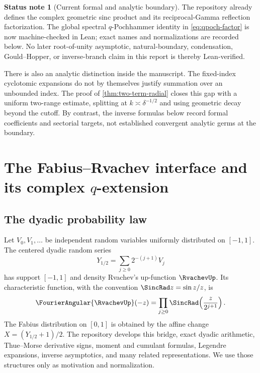 \documentclass[11pt]{article}
\theoremstyle{definition}
\newtheorem{status}[theorem]{Status note}
\begin{document}
\begin{status}[Current formal and analytic boundary]
The repository already defines the complex geometric sinc product and its
reciprocal-Gamma reflection factorization.  The global spectral
$q$-Pochhammer identity in \cref{eq:qpoch-factor} is now machine-checked in
Lean; exact names and normalizations are recorded below.  No later
root-of-unity asymptotic, natural-boundary, condensation, Gould--Hopper, or
inverse-branch claim in this report is thereby Lean-verified.

There is also an analytic distinction inside the manuscript.  The fixed-index
cyclotomic expansions do not by themselves justify summation over an unbounded
index.  The proof of \cref{thm:two-term-radial} closes this gap with a uniform
two-range estimate, splitting at $k\asymp\delta^{-1/2}$ and using geometric
decay beyond the cutoff.  By contrast, the inverse formulas below record
formal coefficients and sectorial targets, not established convergent analytic
germs at the boundary.
\end{status}

\section{The Fabius--Rvachev interface and its complex
\texorpdfstring{$q$}{q}-extension}

\subsection{The dyadic probability law}

Let $V_0,V_1,\dots$ be independent random variables uniformly distributed on $[-1,1]$.  The centered dyadic random series
\begin{equation}
 Y_{1/2}=\sum_{j\ge0}2^{-(j+1)}V_j
 \label{eq:dyadic-series}
\end{equation}
has support $[-1,1]$ and density Rvachev's up-function $\RvachevUp$.  Its characteristic function, with the convention $\SincRad z=\sin z/z$, is
\begin{equation}
 \FourierAngular{\RvachevUp}(-z)
 =\prod_{j\ge0}\SincRad\!\left(\frac{z}{2^{j+1}}\right).
 \label{eq:up-transform}
\end{equation}
The Fabius distribution on $[0,1]$ is obtained by the affine change
\(X=(Y_{1/2}+1)/2\).  The repository develops this bridge, exact dyadic arithmetic, Thue--Morse derivative signs, moment and cumulant formulas, Legendre expansions, inverse asymptotics, and many related representations.  We use those structures only as motivation and normalization.
\end{document}
